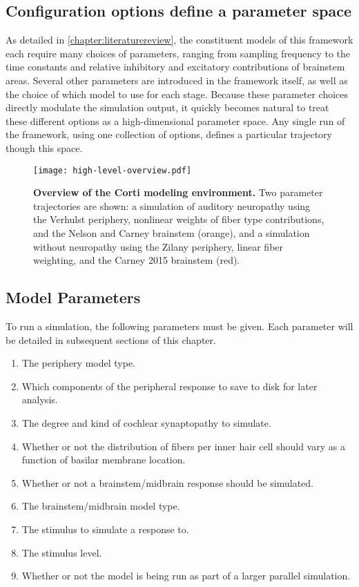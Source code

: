 \subsection{Configuration options define a parameter space}
As detailed in \autoref{chapter:literaturereview}, the constituent models of this framework each require many choices of parameters, ranging from sampling frequency to the time constants and relative inhibitory and excitatory contributions of brainstem areas. Several other parameters are introduced in the framework itself, as well as the choice of which model to use for each stage. Because these parameter choices directly modulate the simulation output, it quickly becomes natural to treat these different options as a high-dimensional parameter space.  Any single run of the framework, using one collection of options, defines a particular trajectory though this space.

\begin{figure}[htbp]
	\centering
	\texttt{[image: high-level-overview.pdf]}
	\caption[Overview of the Corti modeling environment.]{\textbf{Overview of the Corti modeling environment.} Two parameter trajectories are shown: a simulation of auditory neuropathy using the Verhulst periphery, nonlinear weights of fiber type contributions, and the Nelson and Carney brainstem (orange), and a simulation without neuropathy using the Zilany periphery, linear fiber weighting, and the Carney 2015 brainstem (red).}
	\label{fig:corti-overview}
	\end{figure}

\subsection{Model Parameters} %
\label{sub:model_parameters}
To run a simulation, the following parameters must be given.  Each parameter will be detailed in subsequent sections of this chapter. 

\begin{enumerate}
	\item The periphery model type.
	\item Which components of the peripheral response to save to disk for later analysis.
	\item The degree and kind of cochlear synaptopathy to simulate.
	\item Whether or not the distribution of fibers per inner hair cell should vary as a function of basilar membrane location.
	\item Whether or not a brainstem/midbrain response should be simulated.
	\item The brainstem/midbrain model type.
	\item The stimulus to simulate a response to. 
	\item The stimulus level.
	\item Whether or not the model is being run as part of a larger parallel simulation.
\end{enumerate}

